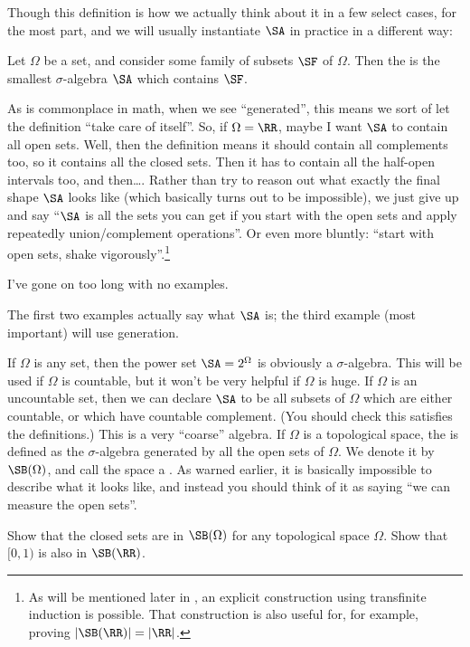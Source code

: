 Though this definition is how we actually think about it in a few select cases,
for the most part, and we will usually instantiate $\SA$ in practice
in a different way:
\begin{definition}
	Let $\Omega$ be a set, and consider some family of subsets $\SF$ of $\Omega$.
	Then the 
	is the smallest $\sigma$-algebra $\SA$ which contains $\SF$.
\end{definition}
As is commonplace in math, when we see ``generated'',
this means we sort of let the definition ``take care of itself''.
So, if $\Omega = \RR$, maybe I want $\SA$ to contain all open sets.
Well, then the definition means it should contain all complements too,
so it contains all the closed sets.
Then it has to contain all the half-open intervals too, and then\dots.
Rather than try to reason out what exactly the final shape $\SA$ looks like
(which basically turns out to be impossible),
we just give up and say ``$\SA$ is all the sets you can get if you start
with the open sets and apply repeatedly union/complement operations''.
Or even more bluntly: ``start with open sets, shake vigorously''.\footnote{As
	will be mentioned later in ,
	an explicit construction using transfinite induction is possible.
	That construction is also useful for, for example, proving $|\SB(\RR)| = |\RR|$.}

I've gone on too long with no examples.
\begin{example}
	The first two examples actually say what $\SA$ is;
	the third example (most important) will use generation.
	\begin{enumerate}[(a)]
		\ii If $\Omega$ is any set,
		then the power set $\SA = 2^{\Omega}$ is obviously a $\sigma$-algebra.
		This will be used if $\Omega$ is countable,
		but it won't be very helpful if $\Omega$ is huge.
		\ii If $\Omega$ is an uncountable set,
		then we can declare $\SA$ to be all subsets of $\Omega$
		which are either countable,
		or which have countable complement.
		(You should check this satisfies the definitions.)
		This is a very ``coarse'' algebra.
		\ii If $\Omega$ is a topological space,
		the 
		is defined as the $\sigma$-algebra generated by all the open sets of $\Omega$.
		We denote it by $\SB(\Omega)$,
		and call the space a .
		As warned earlier, it is basically impossible to describe
		what it looks like,
		and instead you should think of it as saying
		``we can measure the open sets''.
	\end{enumerate}
\end{example}
\begin{ques}
	Show that the closed sets are in $\SB(\Omega)$ for
	any topological space $\Omega$.
	Show that $[0,1)$ %
	is also in $\SB(\RR)$.
\end{ques}

